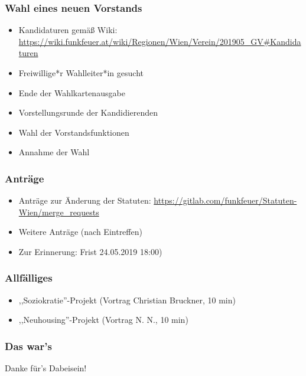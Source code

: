 \documentclass[17pt]{beamer}
\begin{document}
\begin{frame}
	\frametitle{Wahl eines neuen Vorstands}
	\begin{itemize}
		\item Kandidaturen gemäß Wiki: \url{https://wiki.funkfeuer.at/wiki/Regionen/Wien/Verein/201905_GV\#Kandidaturen}
		\item Freiwillige*r Wahlleiter*in gesucht
		\item Ende der Wahlkartenausgabe
		\item Vorstellungsrunde der Kandidierenden
		\item Wahl der Vorstandsfunktionen
		\item Annahme der Wahl
	\end{itemize}
\end{frame}



\begin{frame}
	\frametitle{Anträge}
	\begin{itemize}
		\item Anträge zur Änderung der Statuten: \url{https://gitlab.com/funkfeuer/Statuten-Wien/merge_requests
}
		\item Weitere Anträge (nach Eintreffen)
		\item Zur Erinnerung: Frist 24.05.2019 18:00)
	\end{itemize}
\end{frame}



\begin{frame}
	\frametitle{Allfälliges}
	\begin{itemize}
		\item ,,Soziokratie''-Projekt (Vortrag Christian Bruckner, 10 min)
		\item ,,Neuhousing''-Projekt (Vortrag N. N., 10 min)
	\end{itemize}
\end{frame}



\begin{frame}
	\frametitle{Das war's}
	Danke für's Dabeisein!
\end{frame}

\end{document}
